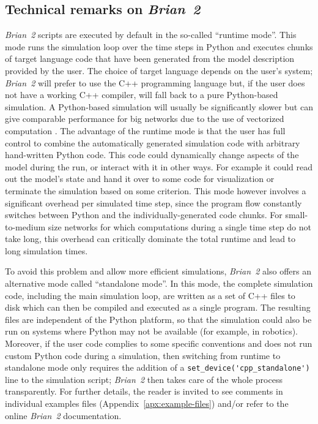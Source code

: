 \documentclass[a4paper, 11pt]{article}
\newcommand{\brian}{\emph{Brian~2}\xspace}
\newcommand*{\appref}[1]{Appendix~\ref{#1}}
\begin{document}
\begin{appendices}
\renewcommand\thetable{\thesection\arabic{table}}

\section{Technical remarks on \brian} \label{apx:tech-stuff}
\brian scripts are executed by default in the so-called ``runtime mode''. This mode runs the simulation loop over the time steps in Python and executes chunks of target language code that have been generated from the model description provided by the user.
The choice of target language depends on the user's system; \brian will prefer to use the C++ programming language but, if the user does not have a working C++ compiler, will fall back to a pure Python-based simulation.
A Python-based simulation will usually be significantly slower but can give comparable performance for big networks due to the use of vectorized computation \citep{Brette2011}. 
The advantage of the runtime mode is that the user has full control to combine the automatically generated simulation code with arbitrary hand-written Python code.
This code could dynamically change aspects of the model during the run, or interact with it in other ways.
For example it could read out the model's state and hand it over to some code for visualization or terminate the simulation based on some criterion.
This mode however involves a significant overhead per simulated time step, since the program flow constantly switches between Python and the individually-generated code chunks.
For small-to-medium size networks for which computations during a single time step do not take long, this overhead can critically dominate the total runtime and lead to long simulation times.

To avoid this problem and allow more efficient simulations, \brian also offers an alternative mode called ``standalone mode''.
In this mode, the complete simulation code, including the main simulation loop, are written as a set of C++ files to disk which can then be compiled and executed as a single program.
The resulting files are independent of the Python platform, so that the simulation could also be run on systems where Python may not be available (for example, in robotics).
Moreover, if the user code complies to some specific conventions and does not run custom Python code during a simulation, then switching from runtime to standalone mode only requires the addition of a \lstinline|set_device('cpp_standalone')| line to the simulation script;
\brian then takes care of the whole process transparently.
For further details, the reader is invited to see comments in individual examples files (\appref{apx:example-files}) and/or refer to the online \brian documentation.


\end{appendices}
\end{document}
